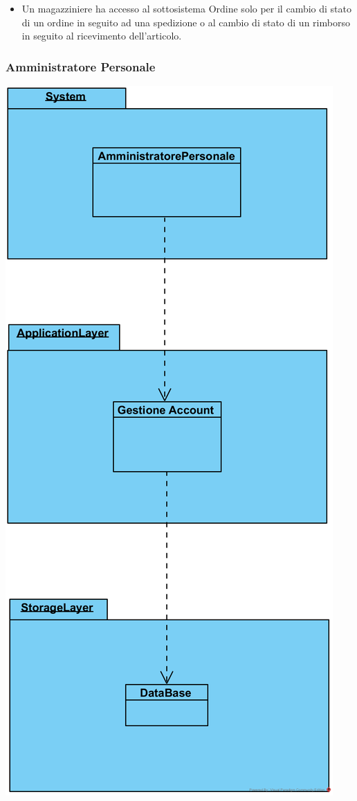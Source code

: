 \documentclass[12pt,a4paper]{article}
\begin{document}
\begin{itemize}
\item Un magazziniere ha accesso al sottosistema Ordine solo per il cambio di stato di un ordine in seguito ad una spedizione o al cambio di stato di un rimborso in seguito al ricevimento dell'articolo.
\end{itemize}

\subsubsection{Amministratore Personale}
\begin{center}
\includegraphics[height=0.34\textheight]{AmministratorePersonale}
\end{center}
\end{document}
